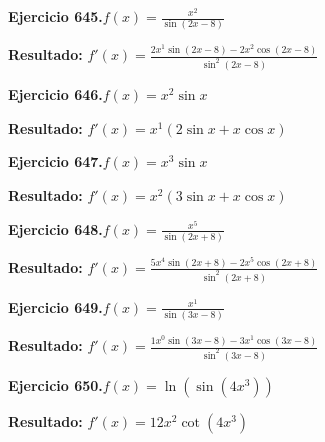 \documentclass[10pt,a4paper]{article}
\begin{document}
\begin{ejbox}
\textbf{Ejercicio 645.}\quad $f(x) = \frac{x^{2}}{\sin(2x -8)}$
\end{ejbox}

\begin{solbox}
\textbf{Resultado:} \(\displaystyle f'(x) = \frac{2x^{1}\sin(2x -8) - 2x^{2}\cos(2x -8)}{\sin^2(2x -8)}\)
\end{solbox}

\newpage
\begin{ejbox}
\textbf{Ejercicio 646.}\quad $f(x) = x^{2} \sin x$
\end{ejbox}

\begin{solbox}
\textbf{Resultado:} \(\displaystyle f'(x) = x^{1}(2\sin x + x\cos x)\)
\end{solbox}

\begin{ejbox}
\textbf{Ejercicio 647.}\quad $f(x) = x^{3} \sin x$
\end{ejbox}

\begin{solbox}
\textbf{Resultado:} \(\displaystyle f'(x) = x^{2}(3\sin x + x\cos x)\)
\end{solbox}

\begin{ejbox}
\textbf{Ejercicio 648.}\quad $f(x) = \frac{x^{5}}{\sin(2x +8)}$
\end{ejbox}

\begin{solbox}
\textbf{Resultado:} \(\displaystyle f'(x) = \frac{5x^{4}\sin(2x +8) - 2x^{5}\cos(2x +8)}{\sin^2(2x +8)}\)
\end{solbox}

\newpage
\begin{ejbox}
\textbf{Ejercicio 649.}\quad $f(x) = \frac{x^{1}}{\sin(3x -8)}$
\end{ejbox}

\begin{solbox}
\textbf{Resultado:} \(\displaystyle f'(x) = \frac{1x^{0}\sin(3x -8) - 3x^{1}\cos(3x -8)}{\sin^2(3x -8)}\)
\end{solbox}

\begin{ejbox}
\textbf{Ejercicio 650.}\quad $f(x) = \ln(\sin(4x^{3}))$
\end{ejbox}

\begin{solbox}
\textbf{Resultado:} \(\displaystyle f'(x) = 12x^{2}\cot(4x^{3})\)
\end{solbox}
\end{document}
